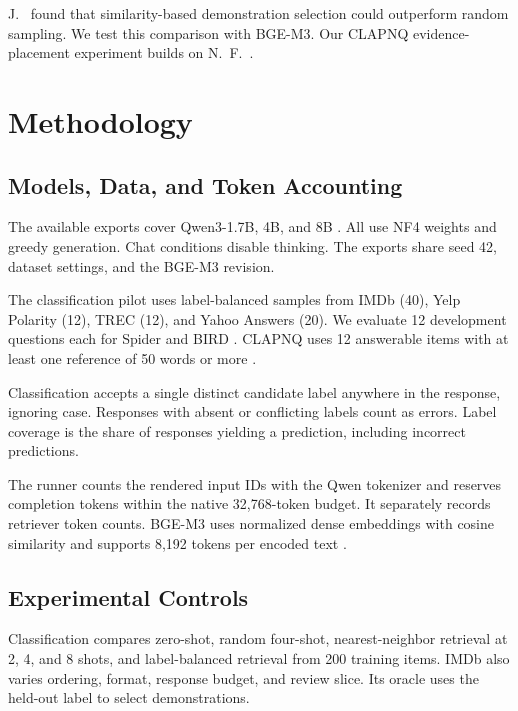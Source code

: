 \documentclass{article}
\begin{document}
J.~\citet{liu2022} found that similarity-based demonstration selection could outperform
random sampling. We test this comparison with BGE-M3. Our CLAPNQ evidence-placement
experiment builds on N.~F.~\citet{liu2024}.

\newpage

\section{Methodology}

\subsection{Models, Data, and Token Accounting}

The available exports cover Qwen3-1.7B, 4B, and 8B \citep{yang2025}. All use NF4 weights and greedy
generation. Chat conditions disable thinking. The exports share seed 42, dataset settings, and
the BGE-M3 revision.

The classification pilot uses label-balanced samples from IMDb (40), Yelp Polarity (12), TREC (12),
and Yahoo Answers (20). We evaluate 12 development questions each for Spider \citep{yu2018} and
BIRD \citep{li2023}. CLAPNQ uses 12 answerable items with at least one reference of 50 words or
more \citep{rosenthal2025}.

Classification accepts a single distinct candidate label anywhere in the response, ignoring case.
Responses with absent or conflicting labels count as errors. Label coverage is the share of
responses yielding a prediction, including incorrect predictions.

The runner counts the rendered input IDs with the Qwen tokenizer and reserves completion tokens
within the native 32,768-token budget. It separately records retriever token counts. BGE-M3 uses
normalized dense embeddings with cosine similarity and supports 8,192 tokens per encoded text
\citep{chen2024}.

\subsection{Experimental Controls}

Classification compares zero-shot, random four-shot, nearest-neighbor retrieval at 2, 4, and 8
shots, and label-balanced retrieval from 200 training items. IMDb also varies ordering, format,
response budget, and review slice. Its oracle uses the held-out label to select demonstrations.
\end{document}
